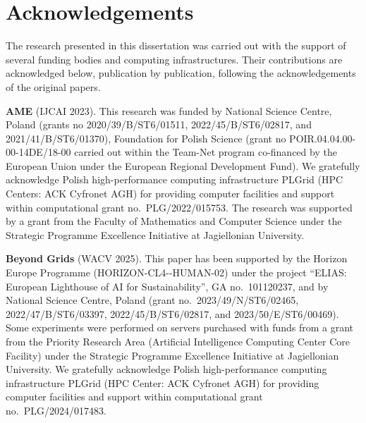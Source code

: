 \chapter*{Acknowledgements}

\begingroup
\sloppy

The research presented in this dissertation was carried out with the support of several
funding bodies and computing infrastructures. Their contributions are acknowledged below,
publication by publication, following the acknowledgements of the original papers.

\vspace{0.5em}
\noindent\textbf{AME} (IJCAI 2023). This research was funded by National Science Centre, Poland
(grants no 2020/39/B/ST6/01511, 2022/45/B/ST6/02817, and 2021/41/B/ST6/01370), Foundation for
Polish Science (grant no POIR.04.04.00-00-14DE/18-00 carried out within the Team-Net program
co-financed by the European Union under the European Regional Development Fund). We gratefully
acknowledge Polish high-performance computing infrastructure PLGrid (HPC Centers: ACK Cyfronet
AGH) for providing computer facilities and support within computational grant
no.\ PLG/2022/015753. The research was supported by a grant from the Faculty of Mathematics and
Computer Science under the Strategic Programme Excellence Initiative at Jagiellonian University.

\vspace{0.5em}
\noindent\textbf{Beyond Grids} (WACV 2025). This paper has been supported by the Horizon Europe
Programme (HORIZON-\allowbreak CL4--\allowbreak HUMAN-02) under the project
``ELIAS: European Lighthouse of AI for Sustainability'', GA no.\ 101120237, and by National Science
Centre, Poland (grant no.\ 2023/49/N/ST6/02465, 2022/47/B/ST6/03397, 2022/45/B/ST6/02817, and
2023/50/E/ST6/00469). Some experiments were performed on servers purchased with funds from a grant
from the Priority Research Area (Artificial Intelligence Computing Center Core Facility) under the
Strategic Programme Excellence Initiative at Jagiellonian University. We gratefully acknowledge
Polish high-performance computing infrastructure PLGrid (HPC Center: ACK Cyfronet AGH) for
providing computer facilities and support within computational grant no.\ PLG/2024/017483.

